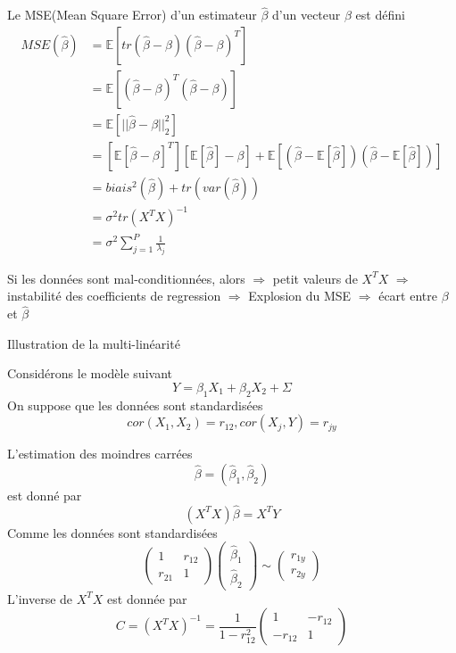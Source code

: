 \documentclass{article}
\begin{document}
Le MSE(Mean Square Error) d'un estimateur $\hat{\beta}$ d'un vecteur $\beta$ est d\'efini
\begin{equation}
\begin{split}
MSE(\hat{\beta})&=\mathbb{E}[tr(\hat{\beta}-\beta)(\hat{\beta}-\beta)^T]\\
&=\mathbb{E}[(\hat{\beta}-\beta)^T(\hat{\beta}-\beta)]\\
&=\mathbb{E}[||\hat{\beta}-\beta||_2^2]\\
&=[\mathbb{E}[\hat{\beta}-\beta]^T][\mathbb{E}[\hat{\beta}]-\beta]+\mathbb{E}[(\hat{\beta}-\mathbb{E}[\hat{\beta}])(\hat{\beta}-\mathbb{E}[\hat{\beta}])]\\
&=biais^2(\hat{\beta})+ tr(var(\hat{\beta}))\\
&=\sigma^2tr(X^TX)^{-1}\\
&=\sigma^2\sum_{j=1}^{P}\frac{1}{\lambda_j}
\end{split}
\end{equation}

Si les donn\'ees sont mal-conditionn\'ees, alors
$\Rightarrow$ petit valeurs de $X^TX$
$\Rightarrow$ instabilit\'e des coefficients de regression
$\Rightarrow$ Explosion du MSE
$\Rightarrow$ \'ecart entre $\beta$ et $\hat{\beta}$


Illustration de la multi-lin\'earit\'e

Consid\'erons le mod\`ele suivant
\begin{equation}
Y=\beta_1X_1+\beta_2X_2+\Sigma
\end{equation}
On suppose que les donn\'ees sont standardis\'ees
\begin{equation}
cor(X_1,X_2)=r_{12}, cor(X_j,Y)=r_{jy}
\end{equation}

L'estimation des moindres carr\'ees 
\begin{equation}
\hat{\beta}=(\hat{\beta}_1,\hat{\beta}_2)
\end{equation}
est donn\'e par
\begin{equation}
(X^TX)\hat{\beta}=X^TY
\end{equation}
Comme les donn\'ees sont standardis\'ees
\begin{equation}
\left(\begin{array}{cc}
1 & r_{12} \\
r_{21} & 1
\end{array}\right)
\left(\begin{array}{cc}
\hat{\beta}_1\\
\hat{\beta}_2
\end{array}\right)\sim
\left(\begin{array}{c}
r_{1y}\\
r_{2y}
\end{array}\right)
\end{equation}
L'inverse de $X^TX$ est donn\'ee par 
\begin{equation}
C=(X^TX)^{-1}=\frac{1}{1-r_{12}^2}\left(\begin{array}{cc}
1 & -r_{12}\\
-r_{12} & 1
\end{array}\right)
\end{equation}
\end{document}
